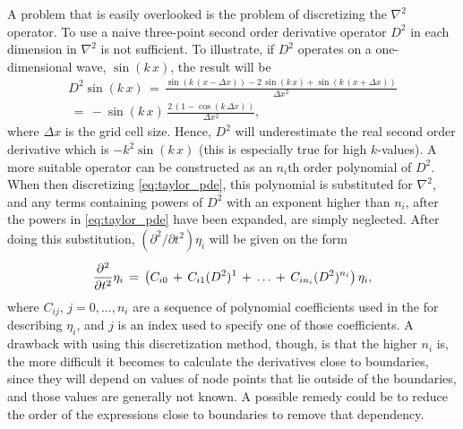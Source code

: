 A problem that is easily overlooked is the problem of discretizing the $\nabla^2$ operator. To use a naive three-point second order derivative operator $D^2$ in each dimension in $\nabla^2$ is not sufficient. To illustrate, if $D^2$ operates on a one-dimensional wave, $\sin(k\,x)$, the result will be
%
\begin{equation}
\renewcommand*{\arraystretch}{2}
\begin{array}{c}
\displaystyle D^2\sin(k\,x) \,=\, \frac{\sin(k\,(x-\Delta x)) - 2\,\sin(k\,x) + \sin(k\,(x+\Delta x))}{\Delta x^2} \\
\displaystyle \,=\, -\sin(k\,x)\,\frac{2\,(1-\cos(k\,\Delta x))}{\Delta x^2},
\end{array}
\end{equation}
%
where $\Delta x$ is the grid cell size. Hence, $D^2$ will underestimate the real second order derivative which is $-k^2\sin(k\,x)$ (this is especially true for high $k$-values). A more suitable operator can be constructed as an $n_i$th order polynomial of $D^2$. When then discretizing \eqref{eq:taylor_pde}, this polynomial is substituted for $\nabla^2$, and any terms containing powers of $D^2$ with an exponent higher than $n_i$, after the powers in \eqref{eq:taylor_pde} have been expanded, are simply neglected. After doing this substitution, $(\partial^2/\partial t^2)\eta_i$ will be given on the form
%
\begin{equation} \label{eq:polynomial_pde}
\renewcommand*{\arraystretch}{2}
\begin{array}{c}
\displaystyle \frac{\partial^2}{\partial t^2}\eta_i \,=\, \left(C_{i0} \,+\, C_{i1}(D^2)^1 \,+\, \dots \,+\, C_{in_i}(D^2)^{n_i}\right)\eta_i,
\end{array}
\end{equation}
%
where $C_{ij},\,j=0,\dots,n_i$ are a sequence of polynomial coefficients used in the \PDE for describing $\eta_i$, and $j$ is an index used to specify one of those coefficients. A drawback with using this discretization method, though, is that the higher $n_i$ is, the more difficult it becomes to calculate the derivatives close to boundaries, since they will depend on values of node points that lie outside of the boundaries, and those values are generally not known. A possible remedy could be to reduce the order of the expressions close to boundaries to remove that dependency.

